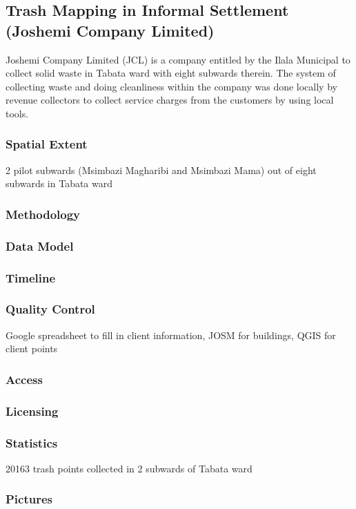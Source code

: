 \documentclass[a4paper,12pt,twoside]{article}
\begin{document}
\newpage
\subsection{Trash Mapping in Informal Settlement (Joshemi Company Limited)}

Joshemi Company Limited (JCL) is a company entitled by the Ilala Municipal to collect solid waste in Tabata ward with eight subwards therein. The system of collecting waste and doing cleanliness within the company was done locally by revenue collectors to collect service charges from the customers by using local tools.
\subsubsection {Spatial Extent}
2 pilot subwards (Msimbazi Magharibi and Msimbazi Mama) out of eight subwards in Tabata ward
\subsubsection{Methodology}
\subsubsection{Data Model}
\subsubsection{Timeline}
\subsubsection{Quality Control}
Google spreadsheet to fill in client information, JOSM for buildings, QGIS for client points
\subsubsection{Access}
\subsubsection{Licensing}
\subsubsection{Statistics}
20163 trash points collected in 2 subwards of Tabata ward
\subsubsection{Pictures}
\newpage
\end{document}
